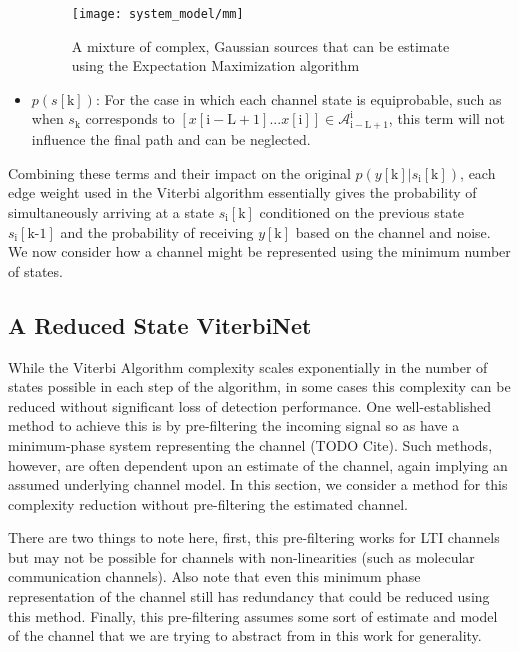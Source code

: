 \begin{itemize}

\begin{figure}[H]
\centering
	\texttt{[image: system\_model/mm]}
	  	  \caption{A mixture of complex, Gaussian sources that can be estimate using the Expectation Maximization algorithm}
	  \label{fig:mm}
\end{figure}

\item $p(s[\text{k}])$: For the case in which each channel state is equiprobable, such as when $s_{\text{k}}$ corresponds to $\left[x[\mathrm{i-L+1}]...x[\mathrm{i}]\right] \in \mathcal{A}_{\mathrm{i-L+1}}^{\mathrm{i}}$, this term will not influence the final path and can be neglected.

\end{itemize}

Combining these terms and their impact on the original $p(y[\mathrm{k}]|s_{\text{i}}[\text{k}])$, each edge weight used in the Viterbi algorithm essentially gives the probability of simultaneously arriving at a state $s_{\text{i}}[\text{k}]$ conditioned on the previous state $s_{\text{i}}[\text{k-1}]$ and the probability of receiving $y[\mathrm{k}]$ based on the channel and noise. 
We now consider how a channel might be represented using the minimum number of states.

\subsection{A Reduced State ViterbiNet}
While the Viterbi Algorithm complexity scales exponentially in the number of states possible in each step of the algorithm, in some cases this complexity can be reduced without significant loss of detection performance. One well-established method to achieve this is by pre-filtering the incoming signal so as have a minimum-phase system representing the channel (TODO Cite). Such methods, however, are often dependent upon an estimate of the channel, again implying an assumed underlying channel model. In this section, we consider a method for this complexity reduction without pre-filtering the estimated channel.

There are two things to note here, first, this pre-filtering works for LTI channels but may not be possible for channels with non-linearities (such as molecular communication channels). Also note that even this minimum phase representation of the channel still has redundancy that could be reduced using this method. Finally, this pre-filtering assumes some sort of estimate and model of the channel that we are trying to abstract from in this work for generality. 


